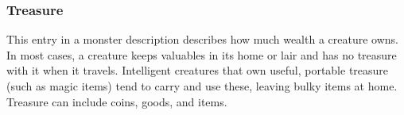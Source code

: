 \subsubsection{Treasure} This entry in a monster description describes how much wealth a creature owns. In most cases, a creature keeps valuables in its home or lair and has no treasure with it when it travels. Intelligent creatures that own useful, portable treasure (such as magic items) tend to carry and use these, leaving bulky items at home. Treasure can include coins, goods, and items. 
\begin{comment}
Creatures can have varying amounts of each, as follows.
\subparhead{Standard} Refer to the treasure tables and roll d\% once for each type of treasure (Coins, Goods, Items) on the Level section of the table that corresponds to the creature's Challenge Rating (for groups of creatures, use the Encounter Level for the encounter instead). Some creatures have double, triple, or even quadruple standard treasure; in these cases, roll for each type of treasure two, three, or four times.
\subparhead{None} The creature collects no treasure of its own.
\subparhead{Nonstandard} Some creatures have quirks or habits that affect the types of treasure they collect. These creatures use the same
treasure tables, but with special adjustments.
\subparhead{Fractional Coins} Roll on the Coins column in the section corresponding to the creature's Challenge Rating, but divide the result as indicated.
\subparhead{\% Goods or Items} The creature has goods or items only some of the time. Before checking for goods or items, roll d\% against the given percentage. On a success, make a normal roll on the appropriate Goods or Items column (which may still result in no goods or items).
\subparhead{Double Goods or Items} Roll twice on the appropriate Goods or Items column.
\subparhead{Parenthetical Notes} Some entries for goods or items include notes that limit the types of treasure a creature collects.

When a note includes the word ``no,'' it means the creature does not collect or cannot keep that thing. If a random roll generates such a result, treat the result as ``none'' instead. 

When a note includes the word ``only,'' the creature goes out of its way to collect treasure of the indicated type. Treat all results from that column as the indicated type of treasure.
It's sometimes necessary to reroll until the right sort of item appears. 
\end{comment}

